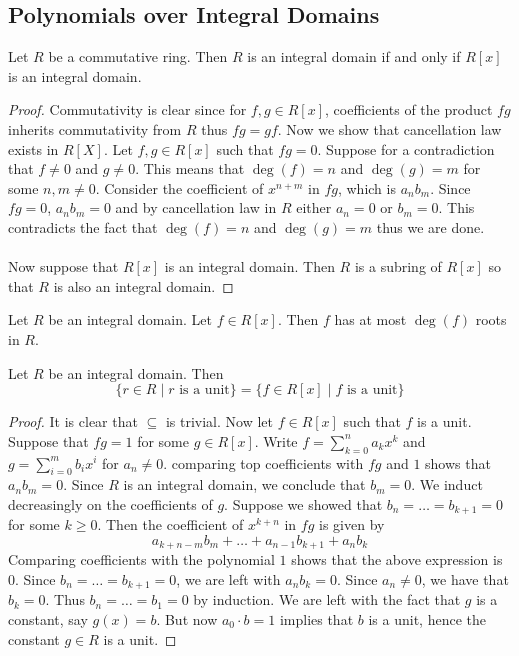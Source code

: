 \documentclass[a4paper]{article}
\begin{document}
\subsection{Polynomials over Integral Domains}
\begin{prp}{}{} Let $R$ be a commutative ring. Then $R$ is an integral domain if and only if $R[x]$ is an integral domain. \tcbline
\begin{proof}
Commutativity is clear since for $f,g\in R[x]$, coefficients of the product $fg$ inherits commutativity from $R$ thus $fg=gf$. Now we show that cancellation law exists in $R[X]$. Let $f,g\in R[x]$ such that $fg=0$. Suppose for a contradiction that $f\neq 0$ and $g\neq 0$. This means that $\deg(f)=n$ and $\deg(g)=m$ for some $n,m\neq 0$. Consider the coefficient of $x^{n+m}$ in $fg$, which is $a_nb_m$. Since $fg=0$, $a_nb_m=0$ and by cancellation law in $R$ either $a_n=0$ or $b_m=0$. This contradicts the fact that $\deg(f)=n$ and $\deg(g)=m$ thus we are done. \\~\\

Now suppose that $R[x]$ is an integral domain. Then $R$ is a subring of $R[x]$ so that $R$ is also an integral domain. 
\end{proof}
\end{prp}

\begin{prp}{}{} Let $R$ be an integral domain. Let $f\in R[x]$. Then $f$ has at most $\deg(f)$ roots in $R$. 
\end{prp}

\begin{prp}{}{} Let $R$ be an integral domain. Then $$\{r\in R\;|\;r\text{ is a unit}\}=\{f\in R[x]\;|\;f\text{ is a unit}\}$$ \tcbline
\begin{proof}
It is clear that $\subseteq$ is trivial. Now let $f\in R[x]$ such that $f$ is a unit. Suppose that $fg=1$ for some $g\in R[x]$. Write $f=\sum_{k=0}^na_kx^k$ and $g=\sum_{i=0}^mb_ix^i$ for $a_n\neq 0$. comparing top coefficients with $fg$ and $1$ shows that $a_nb_m=0$. Since $R$ is an integral domain, we conclude that $b_m=0$. We induct decreasingly on the coefficients of $g$. Suppose we showed that $b_n=\dots=b_{k+1}=0$ for some $k\geq 0$. Then the coefficient of $x^{k+n}$ in $fg$ is given by $$a_{k+n-m}b_m+\dots+a_{n-1}b_{k+1}+a_nb_k$$ Comparing coefficients with the polynomial $1$ shows that the above expression is $0$. Since $b_n=\dots=b_{k+1}=0$, we are left with $a_nb_k=0$. Since $a_n\neq 0$, we have that $b_k=0$. Thus $b_n=\dots=b_1=0$ by induction. We are left with the fact that $g$ is a constant, say $g(x)=b$. But now $a_0\cdot b=1$ implies that $b$ is a unit, hence the constant $g\in R$ is a unit. 
\end{proof}
\end{prp}
\end{document}
